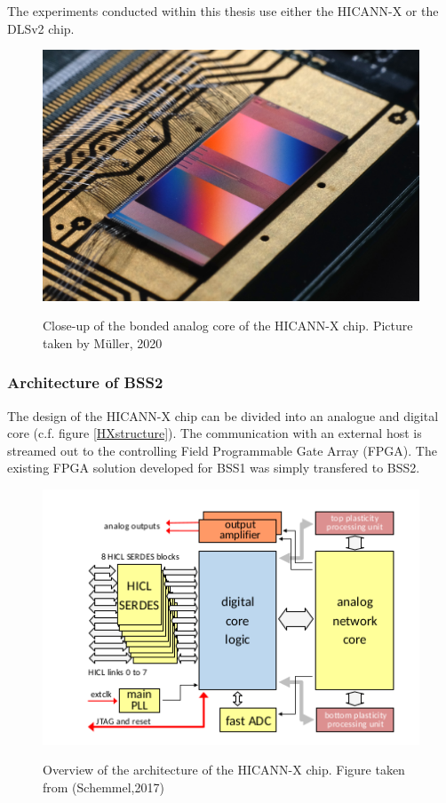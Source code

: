 The experiments conducted within this thesis use either the HICANN-X or the DLSv2 chip.

\begin{figure}
	\includegraphics[width=\linewidth]{figures/HXcloseup.JPG}
	\label{hxcloseup}
	\caption{Close-up of the bonded analog core of the HICANN-X chip. Picture taken by Müller, 2020}
\end{figure}

\subsubsection{Architecture of BSS2}

The design of the HICANN-X chip can be divided into an analogue and digital core (c.f. figure \ref{HXstructure}). The communication with an external host is streamed out to the controlling Field Programmable Gate Array (FPGA). The existing FPGA solution developed for BSS1 was simply transfered to BSS2.

\begin{figure}
	\includegraphics{figures/HXstructure.png}
	\label{hxstructure}
	\caption{Overview of the architecture of the HICANN-X chip. Figure taken from (Schemmel,2017)}
\end{figure}

